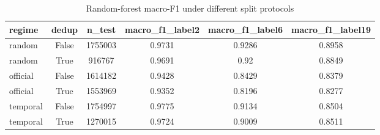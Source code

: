 \begin{table}[htbp]
\centering
\caption{Random-forest macro-F1 under different split protocols}
\label{tab:split_inflation}
\begin{tabular}{lccccc}
\toprule
regime & dedup & n\_test & macro\_f1\_label2 & macro\_f1\_label6 & macro\_f1\_label19 \\
\midrule
random & False & 1755003 & 0.9731 & 0.9286 & 0.8958 \\
random & True & 916767 & 0.9691 & 0.92 & 0.8849 \\
official & False & 1614182 & 0.9428 & 0.8429 & 0.8379 \\
official & True & 1553969 & 0.9352 & 0.8196 & 0.8277 \\
temporal & False & 1754997 & 0.9775 & 0.9134 & 0.8504 \\
temporal & True & 1270015 & 0.9724 & 0.9009 & 0.8511 \\
\bottomrule
\end{tabular}
\end{table}